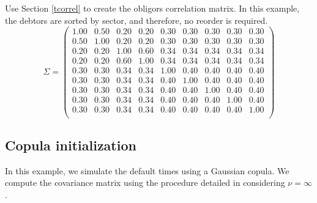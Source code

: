 \documentclass[a4paper,12pt,final]{article}
\begin{document}
Use Section \ref{tcorrel} to create the obligors correlation matrix. In 
this example, the debtors are sorted by sector, and therefore, no reorder is 
required.
\begin{displaymath}
\Sigma = 
\left( 
\begin{array}{cc|cc|ccccc}
 1.00 & 0.50 & 0.20 & 0.20 & 0.30 & 0.30 & 0.30 & 0.30 & 0.30 \\
 0.50 & 1.00 & 0.20 & 0.20 & 0.30 & 0.30 & 0.30 & 0.30 & 0.30 \\
\hline
 0.20 & 0.20 & 1.00 & 0.60 & 0.34 & 0.34 & 0.34 & 0.34 & 0.34 \\
 0.20 & 0.20 & 0.60 & 1.00 & 0.34 & 0.34 & 0.34 & 0.34 & 0.34 \\
\hline
 0.30 & 0.30 & 0.34 & 0.34 & 1.00 & 0.40 & 0.40 & 0.40 & 0.40 \\
 0.30 & 0.30 & 0.34 & 0.34 & 0.40 & 1.00 & 0.40 & 0.40 & 0.40 \\
 0.30 & 0.30 & 0.34 & 0.34 & 0.40 & 0.40 & 1.00 & 0.40 & 0.40 \\
 0.30 & 0.30 & 0.34 & 0.34 & 0.40 & 0.40 & 0.40 & 1.00 & 0.40 \\
 0.30 & 0.30 & 0.34 & 0.34 & 0.40 & 0.40 & 0.40 & 0.40 & 1.00 \\
\end{array}
\right)
\end{displaymath}

\subsection{Copula initialization}

In this example, we simulate the default times using a Gaussian copula. 
We compute the covariance matrix using the procedure detailed in 
\cite{ccruncher:astin} considering $\nu=\infty$.
\newline
\end{document}
